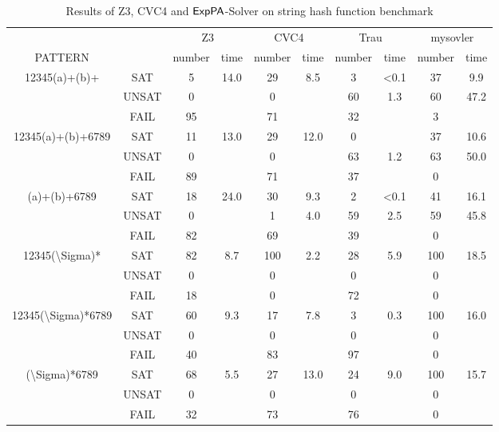 \begin{table*}[]
    \label{table:string}
    \caption{Results of Z3, CVC4 and ${\sf ExpPA}$-Solver on string hash function benchmark}
    \centering
    \begin{tabular}{cc|cc|cc|cc|cc}
        &  & \multicolumn{2}{c|}{Z3} & \multicolumn{2}{c|}{CVC4} & \multicolumn{2}{c|}{Trau} & \multicolumn{2}{c}{mysovler} \\
       PATTERN &  & number & time & number & time & number & time & number & time \\ \hline
       \multirow{3}{*}{12345(a)+(b)+} & SAT & 5 & 14.0 & 29 & 8.5 & 3 & \textless{}0.1 & 37 & 9.9 \\
        & UNSAT & 0 &  & 0 &  & 60 & 1.3 & 60 & 47.2 \\
        & FAIL & 95 &  & 71 &  & 32 &  & 3 &  \\ \hline
       \multirow{3}{*}{12345(a)+(b)+6789} & SAT & 11 & 13.0 & 29 & 12.0 & 0 &  & 37 & 10.6 \\
        & UNSAT & 0 &  & 0 &  & 63 & 1.2 & 63 & 50.0 \\
        & FAIL & 89 &  & 71 &  & 37 &  & 0 &  \\ \hline
       \multirow{3}{*}{(a)+(b)+6789} & SAT & 18 & 24.0 & 30 & 9.3 & 2 & \textless{}0.1 & 41 & 16.1 \\
        & UNSAT & 0 &  & 1 & 4.0 & 59 & 2.5 & 59 & 45.8 \\
        & FAIL & 82 &  & 69 &  & 39 &  & 0 &  \\ \hline
       \multirow{3}{*}{12345(\textbackslash{}Sigma)*} & SAT & 82 & 8.7 & 100 & 2.2 & 28 & 5.9 & 100 & 18.5 \\
        & UNSAT & 0 &  & 0 &  & 0 &  & 0 &  \\
        & FAIL & 18 &  & 0 &  & 72 &  & 0 &  \\ \hline
       \multirow{3}{*}{12345(\textbackslash{}Sigma)*6789} & SAT & 60 & 9.3 & 17 & 7.8 & 3 & 0.3 & 100 & 16.0 \\
        & UNSAT & 0 &  & 0 &  & 0 &  & 0 &  \\
        & FAIL & 40 &  & 83 &  & 97 &  & 0 &  \\ \hline
       \multirow{3}{*}{(\textbackslash{}Sigma)*6789} & SAT & 68 & 5.5 & 27 & 13.0 & 24 & 9.0 & 100 & 15.7 \\
        & UNSAT & 0 &  & 0 &  & 0 &  & 0 &  \\
        & FAIL & 32 &  & 73 &  & 76 &  & 0 & 
       \end{tabular}
\end{table*}